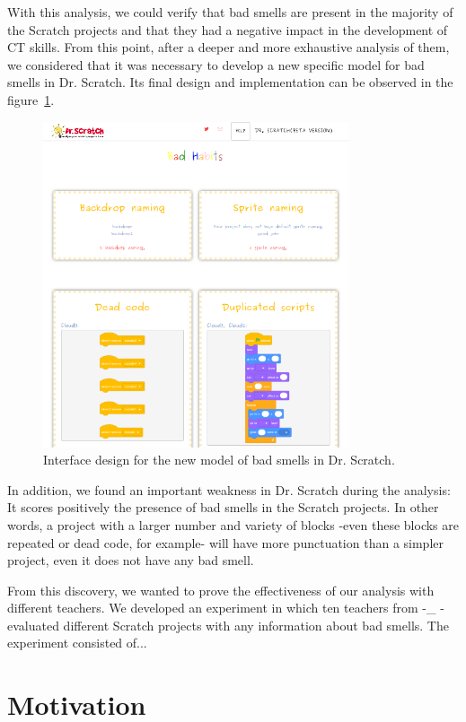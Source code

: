 With this analysis, we could verify that bad smells are present in the majority of the Scratch projects and that they had a negative impact in the development of CT skills. From this point, after a deeper and more exhaustive analysis of them, we considered that it was necessary to develop a new specific model for bad smells in Dr. Scratch. Its final design and implementation can be observed in the figure~\ref{fig:bad_smells_model}.

\begin{figure}
  \centering
  \includegraphics[width=9cm, keepaspectratio]{img/new_model.png}
  \caption{Interface design for the new model of bad smells in Dr. Scratch.}
  \label{fig:bad_smells_model}
\end{figure}

In addition, we found an important weakness in Dr. Scratch during the analysis: It scores positively the presence of bad smells in the Scratch projects. In other words, a project with a larger number and variety of blocks -even these blocks are repeated or dead code, for example- will have more punctuation than a simpler project, even it does not have any bad smell. 

From this discovery, we wanted to prove the effectiveness of our analysis with different teachers. We developed an experiment in which ten teachers from -\_ - evaluated different Scratch projects with any information about bad smells. The experiment consisted of...


\section{Motivation}
\label{sec:motivation}

